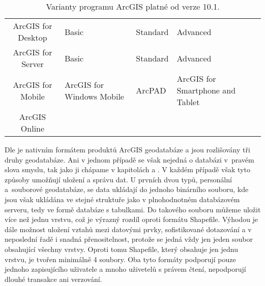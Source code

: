         \begin{table}[H]
          \caption{Varianty programu ArcGIS platné od verze 10.1.}
          \label{verzeArcGIS}
          \begin{footnotesize}
            \begin{center}
              \begin{tabular}{|>{\centering} c |>{\centering}m{9.5em}  m{8.5em}  <{\centering} m{11em}  <{\centering}|}
                \hline
                {\bf \color{purpurova7}Produkt}	& \multicolumn{3}{c|}{\bf \color{purpurova7}Verze} \\
                \hline
                ArcGIS for Desktop & Basic & Standard & Advanced \\
                 ArcGIS for Server &	Basic &	Standard &	Advanced \\
                 ArcGIS for Mobile &	ArcGIS for Windows Mobile &	ArcPAD &	ArcGIS for Smartphone and Tablet \\
                   ArcGIS Online   & & &	\\	
                \hline
              \end{tabular}
            \end{center}
          \end{footnotesize}
        \end{table}

        Dle \cite{Law2008} je nativním formátem produktů ArcGIS geodatabáze a jsou rozlišovány tři druhy geodatabáze. Ani v jednom případě se však nejedná o databázi v~pravém slova smyslu, tak jako ji chápame v kapitolách  a . V každém případě však tyto způsoby umožňují uložení a správu dat. U prvních dvou typů, personální a~souborové geodatabáze, se data ukládají do jednoho binárního souboru, kde jsou však ukládána ve stejné struktuře jako v plnohodnotném databázovém serveru, tedy ve formě databáze s tabulkami. Do takového souboru můžeme uložit více než jednu vrstvu, což je výrazný rozdíl oproti formátu Shapefile. Výhodou je dále možnost uložení vztahů mezi datovými prvky, sofistikované dotazování a v neposlední řadě i snadná přenositelnost, protože se jedná vždy jen jeden soubor obsahující všechny vrstvy. Oproti tomu Shapefile, který obsahuje jen jednu vrstvu, je tvořen minimálně 4 soubory. Oba tyto formáty podporují pouze jednoho zapisujícího uživatele a mnoho uživetelů s právem čtení, nepodporují dlouhé transakce ani verzování.

